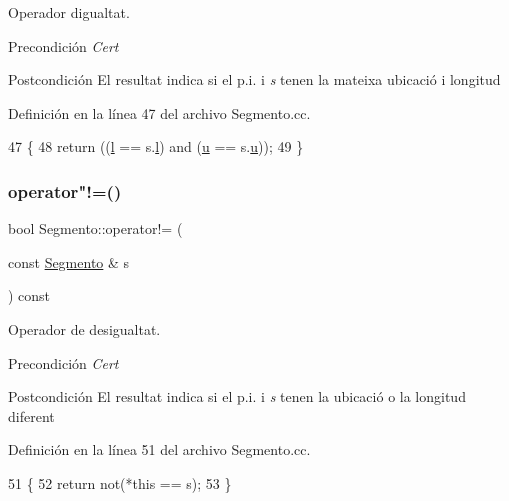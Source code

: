 Operador d\textquotesingle{}igualtat. 

\begin{DoxyPrecond}{Precondición}
{\itshape Cert} 
\end{DoxyPrecond}
\begin{DoxyPostcond}{Postcondición}
El resultat indica si el p.\+i. i {\itshape s} tenen la mateixa ubicació i longitud 
\end{DoxyPostcond}


Definición en la línea 47 del archivo Segmento.\+cc.


\begin{DoxyCode}
47                                                  \{
48   \textcolor{keywordflow}{return} ((\hyperlink{class_segmento_a8b59abc9de156b52370dd759beab031d}{l} == s.\hyperlink{class_segmento_a8b59abc9de156b52370dd759beab031d}{l}) and (\hyperlink{class_segmento_a7fab9490df9b1b655bb88c2deb6e72ef}{u} == s.\hyperlink{class_segmento_a7fab9490df9b1b655bb88c2deb6e72ef}{u}));
49 \}
\end{DoxyCode}
\mbox{\label{class_segmento_a77db9ed1b0a50b2cc1783c57a25f359a}} 
\subsubsection{\texorpdfstring{operator"!=()}{operator!=()}}
{\footnotesize\ttfamily bool Segmento\+::operator!= (\begin{DoxyParamCaption}\item[{const \hyperlink{class_segmento}{Segmento} \&}]{s }\end{DoxyParamCaption}) const}



Operador de desigualtat. 

\begin{DoxyPrecond}{Precondición}
{\itshape Cert} 
\end{DoxyPrecond}
\begin{DoxyPostcond}{Postcondición}
El resultat indica si el p.\+i. i {\itshape s} tenen la ubicació o la longitud diferent 
\end{DoxyPostcond}


Definición en la línea 51 del archivo Segmento.\+cc.


\begin{DoxyCode}
51                                                  \{
52   \textcolor{keywordflow}{return} not(*\textcolor{keyword}{this} == s);
53 \}
\end{DoxyCode}
\mbox{\label{class_segmento_a780e43a2c06be2e098753cd5133f630b}} 
